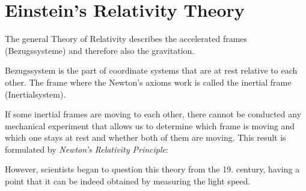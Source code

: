\documentclass{report}
\begin{document}


\newpage
{}
\tableofcontents
\pagebreak

\chapter{Einstein's Relativity Theory}

The general Theory of Relativity describes the accelerated frames (Bezugssysteme) and therefore also the gravitation.

Bezugssystem is the part of coordinate systems that are at rest relative to each other. The frame where the Newton's axioms work is called the inertial frame (Inertialsystem). 

If some inertial frames are moving to each other, there cannot be conducted any mechanical experiment that allows us to determine which frame is moving and which one stays at rest and whether both of them are moving. This result is formulated by \emph{Newton's Relativity Principle}:

However, scientists began to question this theory from the 19. century, having a point that it can be indeed obtained by measuring the light speed.

\end{document}
